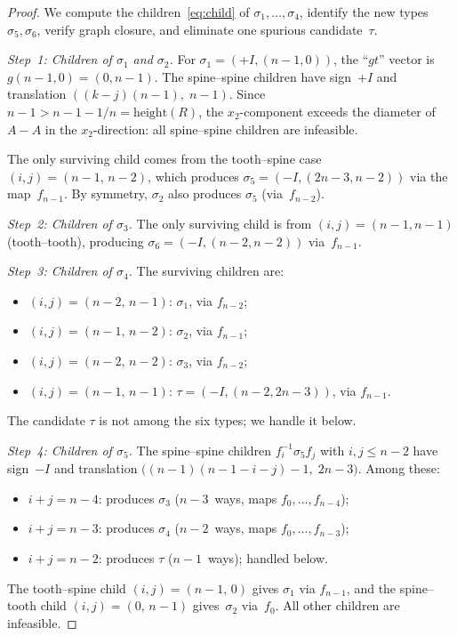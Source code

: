 \documentclass{amsart}
\theoremstyle{definition}
\theoremstyle{remark}
\begin{document}
\begin{proof}
We compute the children~\eqref{eq:child} of $\sigma_1, \ldots, \sigma_4$,
identify the new types $\sigma_5, \sigma_6$, verify graph closure, and
eliminate one spurious candidate~$\tau$.

\emph{Step~1: Children of $\sigma_1$ and $\sigma_2$.}
For $\sigma_1 = (+I, (n{-}1, 0))$, the ``$gt$'' vector is
$g(n{-}1, 0) = (0, n{-}1)$.  The spine--spine children have
sign~$+I$ and translation $((k{-}j)(n{-}1),\; n{-}1)$.  Since
$n{-}1 > n{-}1{-}1/n = \mathrm{height}(R)$, the $x_2$-component
exceeds the diameter of $A{-}A$ in the $x_2$-direction: all
spine--spine children are infeasible.

The only surviving child comes from the tooth--spine case
$(i, j) = (n{-}1,\, n{-}2)$, which produces
$\sigma_5 = (-I, (2n{-}3, n{-}2))$ via the map~$f_{n-1}$.
By symmetry, $\sigma_2$ also produces $\sigma_5$ (via~$f_{n-2}$).

\emph{Step~2: Children of $\sigma_3$.}
The only surviving child is from $(i, j) = (n{-}1, n{-}1)$
(tooth--tooth), producing $\sigma_6 = (-I, (n{-}2, n{-}2))$
via~$f_{n-1}$.

\emph{Step~3: Children of $\sigma_4$.}
The surviving children are:
\begin{itemize}
\item $(i, j) = (n{-}2,\, n{-}1)$: $\sigma_1$, via $f_{n-2}$;
\item $(i, j) = (n{-}1,\, n{-}2)$: $\sigma_2$, via $f_{n-1}$;
\item $(i, j) = (n{-}2,\, n{-}2)$: $\sigma_3$, via $f_{n-2}$;
\item $(i, j) = (n{-}1,\, n{-}1)$: $\tau = (-I, (n{-}2, 2n{-}3))$,
via $f_{n-1}$.
\end{itemize}
The candidate $\tau$ is not among the six types; we handle it below.

\emph{Step~4: Children of $\sigma_5$.}
The spine--spine children $f_i^{-1} \sigma_5 f_j$ with
$i, j \le n{-}2$ have sign~$-I$ and translation
$\bigl((n{-}1)(n{-}1{-}i{-}j) - 1,\; 2n{-}3\bigr)$.
Among these:
\begin{itemize}
\item $i + j = n{-}4$: produces $\sigma_3$
  ($n{-}3$~ways, maps $f_0, \ldots, f_{n-4}$);
\item $i + j = n{-}3$: produces $\sigma_4$
  ($n{-}2$~ways, maps $f_0, \ldots, f_{n-3}$);
\item $i + j = n{-}2$: produces $\tau$
  ($n{-}1$~ways); handled below.
\end{itemize}
The tooth--spine child $(i, j) = (n{-}1,\, 0)$ gives $\sigma_1$
via $f_{n-1}$, and the spine--tooth child $(i, j) = (0,\, n{-}1)$
gives~$\sigma_2$ via~$f_0$.
All other children are infeasible.


\end{proof}
\end{document}
